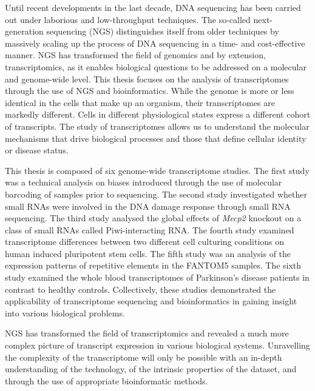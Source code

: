 Until recent developments in the last decade, DNA sequencing has been carried out under laborious and low-throughput techniques. The so-called next-generation sequencing (NGS) distinguishes itself from older techniques by massively scaling up the process of DNA sequencing in a time- and cost-effective manner. NGS has transformed the field of genomics and by extension, transcriptomics, as it enables biological questions to be addressed on a molecular and genome-wide level. This thesis focuses on the analysis of transcriptomes through the use of NGS and bioinformatics. While the genome is more or less identical in the cells that make up an organism, their transcriptomes are markedly different. Cells in different physiological states express a different cohort of transcripts. The study of transcriptomes allows us to understand the molecular mechanisms that drive biological processes and those that define cellular identity or disease status.

This thesis is composed of six genome-wide transcriptome studies. The first study was a technical analysis on biases introduced through the use of molecular barcoding of samples prior to sequencing. The second study investigated whether small RNAs were involved in the DNA damage response through small RNA sequencing. The third study analysed the global effects of \textit{Mecp2} knockout on a class of small RNAs called Piwi-interacting RNA. The fourth study examined transcriptome differences between two different cell culturing conditions on human induced pluripotent stem cells. The fifth study was an analysis of the expression patterns of repetitive elements in the FANTOM5 samples. The sixth study examined the whole blood transcriptomes of Parkinson's disease patients in contrast to healthy controls. Collectively, these studies demonstrated the applicability of transcriptome sequencing and bioinformatics in gaining insight into various biological problems.

NGS has transformed the field of transcriptomics and revealed a much more complex picture of transcript expression in various biological systems. Unravelling the complexity of the transcriptome will only be possible with an in-depth understanding of the technology, of the intrinsic properties of the dataset, and through the use of appropriate bioinformatic methods.
